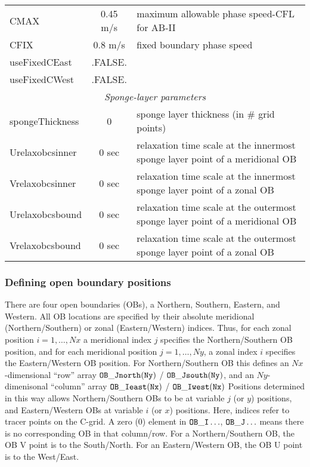 \begin{table}[h!]
{\begin{tabular}{|l|c|l|}
        CMAX & 0.45 m/s & 
           maximum allowable phase speed-CFL for AB-II \\
        CFIX & 0.8 m/s & 
           fixed boundary phase speed \\
        useFixedCEast & .FALSE. & 
           ~ \\
        useFixedCWest & .FALSE. & 
           ~ \\
      \hline
      \multicolumn{3}{|c|}{\textit{Sponge-layer parameters} } \\
      \hline
        spongeThickness & 0 & 
           sponge layer thickness (in \# grid points) \\
        Urelaxobcsinner & 0 sec & 
           relaxation time scale at the 
           innermost sponge layer point of a meridional OB \\
        Vrelaxobcsinner & 0 sec & 
           relaxation time scale at the 
           innermost sponge layer point of a zonal OB \\
        Urelaxobcsbound & 0 sec & 
           relaxation time scale at the 
           outermost sponge layer point of a meridional OB \\
        Vrelaxobcsbound & 0 sec & 
           relaxation time scale at the 
           outermost sponge layer point of a zonal OB \\
         \hline
      \hline
    \end{tabular}
  }
  \caption{~}
\end{table}




\subsubsection{Defining open boundary positions
\label{sec:pkg:obcs:defining}}

There are four open boundaries (OBs), a 
Northern, Southern, Eastern, and Western.
All OB locations are specified by their absolute
meridional (Northern/Southern) or zonal (Eastern/Western) indices.
Thus, for each zonal position $i=1,\ldots,Nx$ a meridional index
$j$ specifies the Northern/Southern OB position,
and for each meridional position $j=1,\ldots,Ny$, a zonal index
$i$ specifies the Eastern/Western OB position.
For Northern/Southern OB this defines an $Nx$-dimensional
``row'' array $\tt OB\_Jnorth(Ny)$ / $\tt OB\_Jsouth(Ny)$,
and an $Ny$-dimenisonal 
``column'' array $\tt OB\_Ieast(Nx)$ / $\tt OB\_Iwest(Nx)$
Positions determined in this way allows Northern/Southern
OBs to be at variable $j$ (or $y$) positions, and Eastern/Western
OBs at variable $i$ (or $x$) positions.
Here, indices refer to tracer points on the C-grid.
A zero (0) element in $\tt OB\_I\ldots$, $\tt OB\_J\ldots$
means there is no corresponding OB in that column/row.
For a Northern/Southern OB, the OB V point is to the South/North.
For an Eastern/Western OB, the OB U point is to the West/East.


